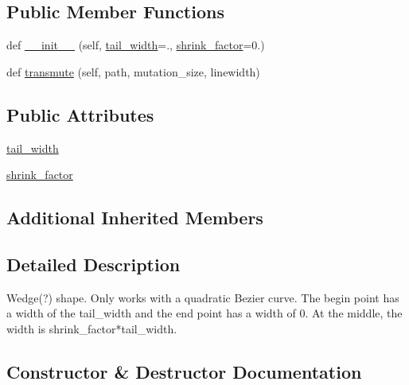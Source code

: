 \subsection*{Public Member Functions}
\begin{DoxyCompactItemize}
\item 
def \hyperlink{classmatplotlib_1_1patches_1_1ArrowStyle_1_1Wedge_a40cbe80d1dda534516bd68040452e247}{\+\_\+\+\_\+init\+\_\+\+\_\+} (self, \hyperlink{classmatplotlib_1_1patches_1_1ArrowStyle_1_1Wedge_a92d725ddac6c38342dceefb3e2e21feb}{tail\+\_\+width}=., \hyperlink{classmatplotlib_1_1patches_1_1ArrowStyle_1_1Wedge_a186ec1fe4ade1753162d2f677fdc3761}{shrink\+\_\+factor}=0.)
\item 
def \hyperlink{classmatplotlib_1_1patches_1_1ArrowStyle_1_1Wedge_a87c1cadb1dd8128a1f16ba0c87cb4cc2}{transmute} (self, path, mutation\+\_\+size, linewidth)
\end{DoxyCompactItemize}
\subsection*{Public Attributes}
\begin{DoxyCompactItemize}
\item 
\hyperlink{classmatplotlib_1_1patches_1_1ArrowStyle_1_1Wedge_a92d725ddac6c38342dceefb3e2e21feb}{tail\+\_\+width}
\item 
\hyperlink{classmatplotlib_1_1patches_1_1ArrowStyle_1_1Wedge_a186ec1fe4ade1753162d2f677fdc3761}{shrink\+\_\+factor}
\end{DoxyCompactItemize}
\subsection*{Additional Inherited Members}


\subsection{Detailed Description}
\begin{DoxyVerb}Wedge(?) shape. Only works with a quadratic Bezier curve.  The
begin point has a width of the tail_width and the end point has a
width of 0. At the middle, the width is shrink_factor*tail_width.
\end{DoxyVerb}
 

\subsection{Constructor \& Destructor Documentation}
\mbox{\label{classmatplotlib_1_1patches_1_1ArrowStyle_1_1Wedge_a40cbe80d1dda534516bd68040452e247}} 

